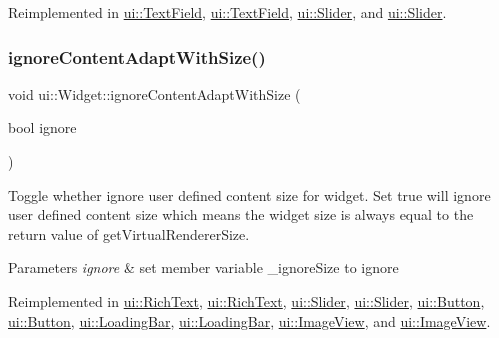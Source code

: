 Reimplemented in \hyperlink{classui_1_1TextField_ac45348cef120c7acdd13e95f72831d2c}{ui\+::\+Text\+Field}, \hyperlink{classui_1_1TextField_a2ef36bd952e7ef2842ca043662b36669}{ui\+::\+Text\+Field}, \hyperlink{classui_1_1Slider_a2b702f67e7e217bac4c618ed0fe36d7a}{ui\+::\+Slider}, and \hyperlink{classui_1_1Slider_a2b702f67e7e217bac4c618ed0fe36d7a}{ui\+::\+Slider}.

\mbox{\label{classui_1_1Widget_a47ec556e48f2ac20290c197e30434d36}} 
\subsubsection{\texorpdfstring{ignore\+Content\+Adapt\+With\+Size()}{ignoreContentAdaptWithSize()}\hspace{0.1cm}{\footnotesize\ttfamily [1/2]}}
{\footnotesize\ttfamily void ui\+::\+Widget\+::ignore\+Content\+Adapt\+With\+Size (\begin{DoxyParamCaption}\item[{bool}]{ignore }\end{DoxyParamCaption})\hspace{0.3cm}{\ttfamily [virtual]}}

Toggle whether ignore user defined content size for widget. Set true will ignore user defined content size which means the widget size is always equal to the return value of {\ttfamily get\+Virtual\+Renderer\+Size}.


\begin{DoxyParams}{Parameters}
{\em ignore} & set member variable \+\_\+ignore\+Size to ignore \\
\hline
\end{DoxyParams}


Reimplemented in \hyperlink{classui_1_1RichText_a82b3965a42f134415afab5605ef73ffa}{ui\+::\+Rich\+Text}, \hyperlink{classui_1_1RichText_a82b3965a42f134415afab5605ef73ffa}{ui\+::\+Rich\+Text}, \hyperlink{classui_1_1Slider_a080562522a4e6fc174fda2cdb6b111af}{ui\+::\+Slider}, \hyperlink{classui_1_1Slider_aa99728d692807df976fa1be592a2838d}{ui\+::\+Slider}, \hyperlink{classui_1_1Button_ad7f80b2facb4b54b8c65fc17dbb7ddda}{ui\+::\+Button}, \hyperlink{classui_1_1Button_acc4c34750dcf72800cebb9bcd3a45b11}{ui\+::\+Button}, \hyperlink{classui_1_1LoadingBar_aef1d41416277666e74f953b072f54964}{ui\+::\+Loading\+Bar}, \hyperlink{classui_1_1LoadingBar_a36fd58efdbc7b7e01adab806f2eab6f2}{ui\+::\+Loading\+Bar}, \hyperlink{classui_1_1ImageView_ac9fea31a3800b0960189d168d90ccb19}{ui\+::\+Image\+View}, and \hyperlink{classui_1_1ImageView_a0c1dbff2c1c5d14ac45f76d6daffadb5}{ui\+::\+Image\+View}.


